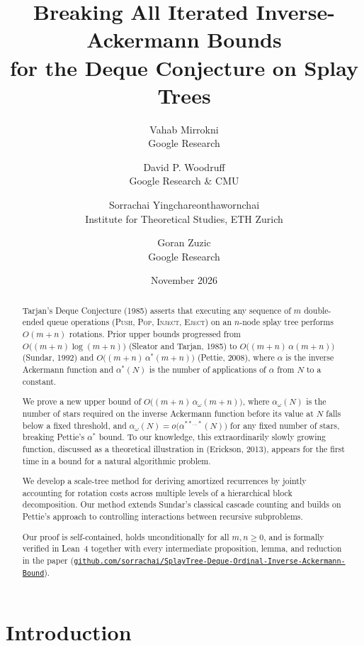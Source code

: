 \documentclass[11pt]{article}
\title{\textbf{Breaking All Iterated Inverse-Ackermann Bounds\\for the Deque Conjecture on Splay Trees}}
\author{
  Vahab Mirrokni\\[-2pt]
  {\small Google Research}
  \and
  David P. Woodruff\\[-2pt]
  {\small Google Research \& CMU}
  \and
  Sorrachai Yingchareonthawornchai\\[-2pt]
  {\small Institute for Theoretical Studies, ETH Zurich}
  \and
  Goran Zuzic\\[-2pt]
  {\small Google Research}
}
\date{November 2026}
\theoremstyle{definition}
\theoremstyle{remark}
\newcommand{\PUSH}{\textnormal{\scshape Push}}
\newcommand{\POP}{\textnormal{\scshape Pop}}
\newcommand{\INJECT}{\textnormal{\scshape Inject}}
\newcommand{\EJECT}{\textnormal{\scshape Eject}}
\begin{document}
\maketitle
{}
\begin{abstract}
Tarjan's Deque Conjecture (1985) asserts that executing any sequence of $m$ double-ended queue operations (\PUSH, \POP, \INJECT, \EJECT) on an $n$-node splay tree performs $O(m + n)$ rotations. Prior upper bounds progressed from $O\big((m + n)\log(m + n)\big)$ (Sleator and Tarjan, 1985) to $O\big((m + n)\,\alpha(m + n)\big)$ (Sundar, 1992) and $O\big((m + n)\,\alpha^*(m + n)\big)$ (Pettie, 2008), where $\alpha$ is the inverse Ackermann function and $\alpha^*(N)$ is the number of applications of $\alpha$ from $N$ to a constant.  

We prove a new upper bound of $O\big((m + n)\,\alpha_\omega(m + n)\big)$, where $\alpha_\omega(N)$ is the number of stars required on the inverse Ackermann function before its value at \(N\) falls below a fixed threshold, and $\alpha_\omega(N) = o\big(\alpha^{**\ldots*}(N)\big)$ for any fixed number of stars, breaking Pettie's $\alpha^*$ bound.
To our knowledge, this extraordinarily slowly growing function, discussed as a theoretical illustration in (Erickson, 2013), appears for the first time in a bound for a natural algorithmic problem.

We develop a scale-tree method for deriving amortized recurrences by jointly accounting for rotation costs across multiple levels of a hierarchical block decomposition. Our method extends Sundar's classical cascade counting and builds on Pettie's approach to controlling interactions between recursive subproblems.

Our proof is self-contained, holds unconditionally for all $m, n \ge 0$, and is formally verified in Lean~4 together with every intermediate proposition, lemma, and reduction in the paper (\href{https://github.com/sorrachai/SplayTree-Deque-Ordinal-Inverse-Ackermann-Bound}{\texttt{github.com/\allowbreak sorrachai/\allowbreak SplayTree-\allowbreak Deque-\allowbreak Ordinal-\allowbreak Inverse-\allowbreak Ackermann-\allowbreak Bound}}).
\end{abstract}
\newpage
\setcounter{tocdepth}{2}
\tableofcontents
\newpage
{}

\section{Introduction}
\label{sec:intro}
\end{document}
